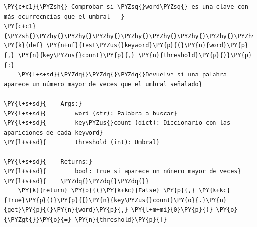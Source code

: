     \begin{tcolorbox}[breakable, size=fbox, boxrule=1pt, pad at break*=1mm,colback=cellbackground, colframe=cellborder]
\begin{Verbatim}[commandchars=\\\{\}]
\PY{c+c1}{\PYZsh{} Comprobar si \PYZsq{}word\PYZsq{} es una clave con más ocurrecncias que el umbral   }
\PY{c+c1}{\PYZsh{}\PYZhy{}\PYZhy{}\PYZhy{}\PYZhy{}\PYZhy{}\PYZhy{}\PYZhy{}\PYZhy{}\PYZhy{}\PYZhy{}\PYZhy{}\PYZhy{}\PYZhy{}\PYZhy{}\PYZhy{}\PYZhy{}\PYZhy{}\PYZhy{}\PYZhy{}\PYZhy{}\PYZhy{}\PYZhy{}\PYZhy{}\PYZhy{}\PYZhy{}\PYZhy{}\PYZhy{}\PYZhy{}\PYZhy{}\PYZhy{}\PYZhy{}\PYZhy{}\PYZhy{}\PYZhy{}\PYZhy{}\PYZhy{}\PYZhy{}\PYZhy{}\PYZhy{}\PYZhy{}\PYZhy{}\PYZhy{}\PYZhy{}\PYZhy{}\PYZhy{}\PYZhy{}\PYZhy{}\PYZhy{}\PYZhy{}\PYZhy{}\PYZhy{}\PYZhy{}\PYZhy{}\PYZhy{}\PYZhy{}\PYZhy{}\PYZhy{}\PYZhy{}\PYZhy{}\PYZhy{}\PYZhy{}\PYZhy{}\PYZhy{}\PYZhy{}\PYZhy{}\PYZhy{}\PYZhy{}\PYZhy{}\PYZhy{}\PYZhy{}\PYZhy{}\PYZhy{}\PYZhy{}\PYZhy{}\PYZhy{}\PYZhy{}\PYZhy{}\PYZhy{}\PYZhy{}\PYZhy{}\PYZhy{}\PYZhy{}}
\PY{k}{def} \PY{n+nf}{test\PYZus{}keyword}\PY{p}{(}\PY{n}{word}\PY{p}{,} \PY{n}{key\PYZus{}count}\PY{p}{,} \PY{n}{threshold}\PY{p}{)}\PY{p}{:}
    \PY{l+s+sd}{\PYZdq{}\PYZdq{}\PYZdq{}Devuelve si una palabra aparece un número mayor de veces que el umbral señalado}

\PY{l+s+sd}{    Args:}
\PY{l+s+sd}{        word (str): Palabra a buscar}
\PY{l+s+sd}{        key\PYZus{}count (dict): Diccionario con las apariciones de cada keyword}
\PY{l+s+sd}{        threshold (int): Umbral}

\PY{l+s+sd}{    Returns:}
\PY{l+s+sd}{        bool: True si aparece un número mayor de veces}
\PY{l+s+sd}{    \PYZdq{}\PYZdq{}\PYZdq{}}
    \PY{k}{return} \PY{p}{(}\PY{k+kc}{False} \PY{p}{,} \PY{k+kc}{True}\PY{p}{)}\PY{p}{[}\PY{n}{key\PYZus{}count}\PY{o}{.}\PY{n}{get}\PY{p}{(}\PY{n}{word}\PY{p}{,} \PY{l+m+mi}{0}\PY{p}{)} \PY{o}{\PYZgt{}}\PY{o}{=} \PY{n}{threshold}\PY{p}{]} 
\end{Verbatim}
\end{tcolorbox}

